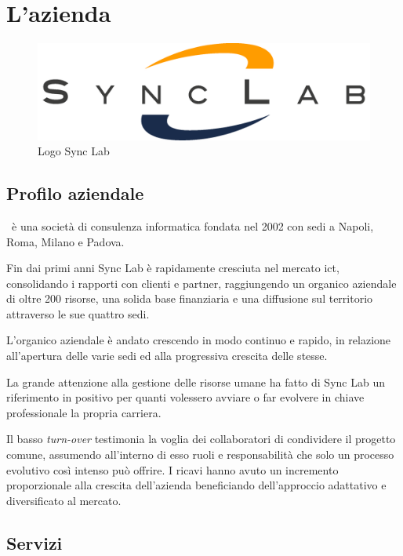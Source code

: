 
\section{L'azienda}

\begin{figure}[H]
	\centering
	\includegraphics[width=\textwidth/2]{immagini/logo-synclab.png}
	\caption{Logo Sync Lab}
\end{figure}

\subsection{Profilo aziendale}
\myCompany\ è una società di consulenza informatica fondata nel 2002 con sedi a Napoli, Roma, Milano e Padova.

Fin dai primi anni Sync Lab è rapidamente cresciuta nel mercato \gls{ict}, consolidando i rapporti con clienti e partner, raggiungendo un organico aziendale di oltre 200 risorse,
una solida base finanziaria e una diffusione sul territorio attraverso le sue quattro sedi.

L'organico aziendale è andato crescendo in modo continuo e rapido, in relazione
all'apertura delle varie sedi ed alla progressiva crescita delle stesse.

La grande attenzione alla gestione delle risorse umane ha fatto di Sync Lab un
riferimento in positivo per quanti volessero avviare o far evolvere in chiave professionale la propria carriera.

Il basso \textit{turn-over} testimonia la voglia dei collaboratori di condividere il progetto comune, assumendo all'interno di esso ruoli e responsabilità che solo un processo
evolutivo così intenso può offrire.
I ricavi hanno avuto un incremento proporzionale alla crescita dell'azienda beneficiando dell'approccio adattativo e diversificato al mercato.

\subsection{Servizi}

